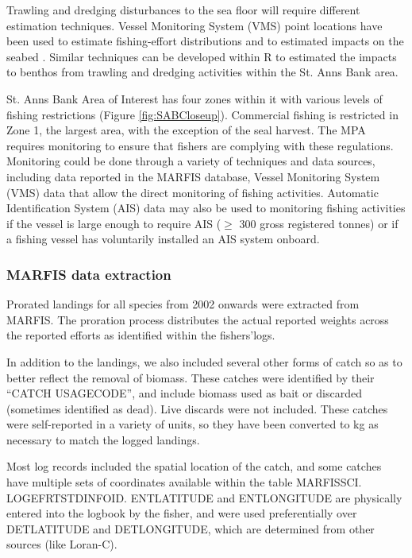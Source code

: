 \documentclass[letterpaper,portrait,11pt]{scrartcl}
\numberwithin{equation}{section}		%
\numberwithin{figure}{section}		%
\numberwithin{table}{section}				%
\begin{document}
Trawling and dredging disturbances to the sea floor will require different estimation techniques.  Vessel Monitoring System (VMS) point locations have been used to estimate fishing-effort distributions \parencites[e.g., ][]{lee2010developing} and to estimated impacts on the seabed \parencite{gerritsen2013much}.  Similar techniques can be developed within R to estimated the impacts to benthos from trawling and dredging activities within the St. Anns Bank area.   


St. Anns Bank Area of Interest has four zones within it with various levels of fishing restrictions (Figure \ref{fig:SABCloseup}). Commercial fishing is restricted in Zone 1, the largest area, with the exception of the seal harvest.  The MPA requires monitoring to ensure that fishers are complying with these regulations.  Monitoring could be done through a variety of techniques and data sources, including data reported in the MARFIS database, Vessel Monitoring System (VMS) data that allow the direct monitoring of fishing activities. Automatic Identification System (AIS) data may also be used to monitoring fishing activities if the vessel is large enough to require AIS ($\geq$ 300 gross registered tonnes) or if a fishing vessel has voluntarily installed an AIS system onboard.  


\subsubsection{MARFIS data extraction}

Prorated landings for all species from 2002 onwards were extracted from MARFIS. The proration process distributes the actual reported weights across the reported efforts as identified within the fishers\textquoteright logs.  

In addition to the landings, we also included several other forms of catch so as to better reflect the removal of biomass. These catches were identified by their \textquotedblleft CATCH \textunderscore USAGE\textunderscore CODE\textquotedblright, and include biomass used as bait or discarded (sometimes identified as dead).  Live discards were not included.  These catches were self-reported in a variety of units, so they have been converted to kg as necessary to match the logged landings. 

Most log records included the spatial location of the catch, and some catches have multiple sets of coordinates available within the table MARFISSCI. LOG\textunderscore EFRT\textunderscore STD\textunderscore INFO\textunderscore ID.  ENT\textunderscore LATITUDE and ENT\textunderscore LONGITUDE are physically entered into the logbook by the fisher, and were used preferentially over DET\textunderscore LATITUDE  and DET\textunderscore LONGITUDE, which are determined from other sources (like Loran-C).  
\end{document}
